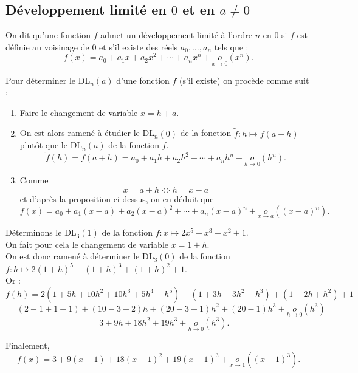 \subsection{Développement limité en $0$ et en $a \neq 0$}

\begin{Def}
On dit qu’une fonction $f$ admet un développement limité à l’ordre $n$ en $0$ si $f$ est définie au voisinage de $0$ et s’il existe des réels $a_0, \ldots, a_n$ tels que :
\[ f(x) = a_0 + a_1 x + a_2 x^2 + \cdots + a_n x^n + \underset{x \to 0}{o}(x^n). \]
\end{Def}

\begin{Meth}
Pour déterminer le DL$_n(a)$ d’une fonction $f$ (s’il existe) on procède comme suit :
\begin{enumerate}
    \item Faire le changement de variable $x = h + a$.
    \item On est alors ramené à étudier le DL$_n(0)$ de la fonction $\tilde{f} : h \mapsto f(a + h)$ plutôt que le DL$_n(a)$ de la fonction $f$.
    \[ \tilde{f}(h) = f(a + h) = a_0 + a_1h + a_2h^2 + \cdots + a_nh^n +\underset{h \to 0}{o}(h^n). \]
    \item Comme
    \[ x = a + h \iff h = x - a \]
    et d’après la proposition ci-dessus, on en déduit que
    \[ f(x) = a_0 + a_1(x - a) + a_2(x - a)^2 + \cdots + a_n(x - a)^n +\underset{x \to a}{o}((x - a)^n). \]
\end{enumerate}
\end{Meth}

\begin{Ex}
Déterminons le DL$_3(1)$ de la fonction $f : x \mapsto 2x^5 - x^3 + x^2 + 1$.\\
 On fait pour cela le changement de variable $x = 1 + h$. \\
 
 On est donc ramené à déterminer le DL$_3(0)$ de la fonction $\tilde{f} : h \mapsto 2(1+h)^5 - (1+h)^3 + (1+h)^2 + 1$.\\
  Or :
\[ \tilde{f}(h) = 2(1 + 5h + 10h^2 + 10h^3 + 5h^4 + h^5) - (1 + 3h + 3h^2 + h^3) + (1 + 2h + h^2) + 1 \]
\[ = (2 - 1 + 1 + 1) + (10 - 3 + 2)h + (20 - 3 + 1)h^2 + (20 - 1)h^3 + \underset{h \to 0}{o}(h^3) \]
\[ = 3 + 9h + 18h^2 + 19h^3 + \underset{h \to 0}{o}(h^3). \]

Finalement,
\[ f(x) = 3 + 9(x - 1) + 18(x - 1)^2 + 19(x - 1)^3 + \underset{x \to 1}{o}((x - 1)^3). \]
\end{Ex}


